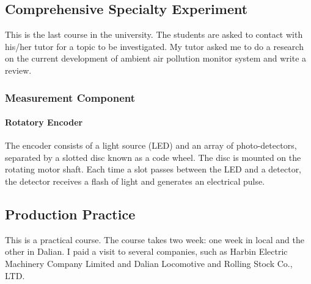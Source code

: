 \subsection{Comprehensive Specialty Experiment}
This is the last course in the university. The students are asked to contact with his/her tutor for a topic to be investigated. My tutor asked me to do a research on the current development of ambient air pollution monitor system and write a review.

\subsubsection{Measurement Component}

\paragraph{Rotatory Encoder} The encoder consists of a light source (LED) and an array of photo-detectors, separated by a slotted disc known as a code wheel. The disc is mounted on the rotating motor shaft. Each time a slot passes between the LED and a detector, the detector receives a flash of light and generates an electrical pulse. 

\subsection{Production Practice}
This is a practical course. The course takes two week: one week in local and the other in Dalian. I paid a visit to several companies, such as Harbin Electric Machinery Company Limited and Dalian Locomotive and Rolling Stock Co., LTD. 